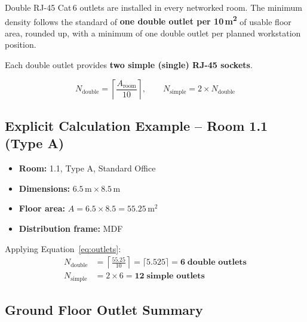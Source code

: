 \documentclass[12pt,a4paper]{report}
\begin{document}
Double RJ-45 Cat\,6 outlets are installed in every networked room.
The minimum density follows the standard of \textbf{one double outlet
per 10\,m\textsuperscript{2}} of usable floor area, rounded up,
with a minimum of one double outlet per planned workstation position.

Each double outlet provides \textbf{two simple (single) RJ-45 sockets}.

\begin{equation}
  N_{\text{double}} = \left\lceil \frac{A_{\text{room}}}{10} \right\rceil,
  \qquad
  N_{\text{simple}} = 2 \times N_{\text{double}}
  \label{eq:outlets}
\end{equation}

\subsection{Explicit Calculation Example -- Room 1.1 (Type A)}

\begin{itemize}[noitemsep]
  \item \textbf{Room:} 1.1, Type A, Standard Office
  \item \textbf{Dimensions:} $6.5\,\mathrm{m} \times 8.5\,\mathrm{m}$
  \item \textbf{Floor area:} $A = 6.5 \times 8.5 = 55.25\,\mathrm{m}^2$
  \item \textbf{Distribution frame:} MDF
\end{itemize}

Applying Equation~\ref{eq:outlets}:
\begin{align*}
  N_{\text{double}} &= \left\lceil \frac{55.25}{10} \right\rceil
                     = \lceil 5.525 \rceil = \mathbf{6\;\text{double outlets}} \\[4pt]
  N_{\text{simple}} &= 2 \times 6 = \mathbf{12\;\text{simple outlets}}
\end{align*}

\subsection{Ground Floor Outlet Summary}
\end{document}
